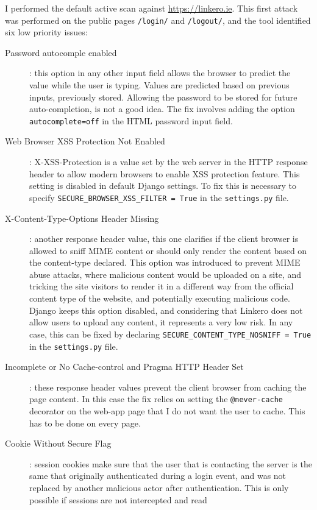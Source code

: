 I performed the default active scan against \url{https://linkero.ie}. This
first attack was performed on the public pages \texttt{/login/} and
\texttt{/logout/}, and the tool identified six low priority issues:
\begin{description}
  \item[Password autocomple enabled]: this option in any other input field
  allows the browser to predict the value while the user is typing. Values are
  predicted based on previous inputs, previously stored. Allowing the password
  to be stored for future auto-completion, is not a good idea. The fix involves
  adding the option \texttt{autocomplete=off} in the HTML password input field.
  \item[Web Browser XSS Protection Not Enabled]: X-XSS-Protection is a
  value set by the web server in the HTTP response header to allow modern
  browsers to enable XSS protection feature. This setting is disabled in default
  Django settings. To fix this is necessary to specify
  \texttt{SECURE\_BROWSER\_XSS\_FILTER = True} in the \texttt{settings.py} file.
  \item[X-Content-Type-Options Header Missing]: another response header value,
  this one clarifies if the client browser is allowed to sniff MIME content or
  should only render the content based on the content-type declared. This option
  was introduced to prevent MIME abuse attacks, where malicious content would be
  uploaded on a site, and tricking the site visitors to render it in a different
  way from the official content type of the website, and potentially executing
  malicious code. Django keeps this option disabled, and considering that
  Linkero does not allow users to upload any content, it represents a very low
  risk. In any case, this can be fixed by declaring
  \texttt{SECURE\_CONTENT\_TYPE\_NOSNIFF = True} in the \texttt{settings.py}
  file.
  \item[Incomplete or No Cache-control and Pragma HTTP Header Set]: these
  response header values prevent the client browser from caching the page
  content. In this case the fix relies on setting the \texttt{@never-cache}
  decorator on the web-app page that I do not want the user to cache. This has
  to be done on every page.
  \item[Cookie Without Secure Flag]: session cookies make sure that the user
  that is contacting the server is the same that originally authenticated during
  a login event, and was not replaced by another malicious actor after
  authentication. This is only possible if sessions are not intercepted and read

\end{description}
